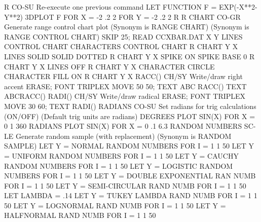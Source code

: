 R                           CO-SU Re-execute one previous command
                                  LET FUNCTION F = EXP(-X**2-Y**2)
                                  3DPLOT F FOR X = -2 .2 2 FOR Y = -2 .2 2
                                  R
R CHART                     CO-GR Generate range control chart plot
                                  (Synonym is RANGE CHART)
                                  (Synonym is RANGE CONTROL CHART)
                                  SKIP 25; READ CCXBAR.DAT X Y
                                  LINES CONTROL CHART
                                  CHARACTERS CONTROL CHART
                                  R CHART Y X
                                  LINES SOLID SOLID DOTTED
                                  R CHART Y X
                                  SPIKE ON
                                  SPIKE BASE 0
                                  R CHART Y X
                                  LINES OFF
                                  R CHART Y X
                                  CHARACTER CIRCLE
                                  CHARACTER FILL ON
                                  R CHART Y X
RACC()                      CH/SY Write/draw right accent
                                  ERASE; FONT TRIPLEX
                                  MOVE 50 50; TEXT ABC RACC()
                                  TEXT ABCRACC()
RADI()                      CH/SY Write/draw radical
                                  ERASE; FONT TRIPLEX
                                  MOVE 30 60; TEXT RADI()
RADIANS                     CO-SU Set radians for trig calculations (ON/OFF)
                                  (Default trig units are radians)
                                  DEGREES
                                  PLOT SIN(X) FOR X = 0 1 360
                                  RADIANS
                                  PLOT SIN(X) FOR X = 0 .1 6.3
RANDOM NUMBERS              SC-LE Generate random sample (with replacement)
                                  (Synonym is RANDOM SAMPLE)
                    LET Y = NORMAL RANDOM NUMBERS FOR I = 1 1 50
                    LET Y = UNIFORM RANDOM NUMBERS FOR I = 1 1 50
                    LET Y = CAUCHY RANDOM NUMBERS FOR I = 1 1 50
                    LET Y = LOGISTIC RANDOM NUMBERS FOR I = 1 1 50
                    LET Y = DOUBLE EXPONENTIAL RAN NUMB FOR I = 1 1 50
                    LET Y = SEMI-CIRCULAR RAND NUMB FOR I = 1 1 50
                    LET LAMBDA = .14
                    LET Y = TUKEY LAMBDA RAND NUMB FOR I = 1 1 50
                    LET Y = LOGNORMAL RAND NUMB FOR I = 1 1 50
                    LET Y = HALFNORMAL RAND NUMB FOR I = 1 1 50
